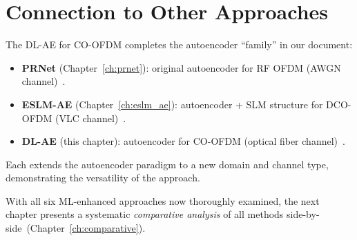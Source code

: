 \section{Connection to Other Approaches}
\label{sec:dlae_connections}

The DL-AE for CO-OFDM completes the autoencoder ``family'' in our document:
\begin{itemize}
    \item \textbf{PRNet} (Chapter~\ref{ch:prnet}): original autoencoder for
          RF OFDM (AWGN channel)~\cite{kim2017novel}.
    \item \textbf{ESLM-AE} (Chapter~\ref{ch:eslm_ae}): autoencoder +
          SLM structure for DCO-OFDM (VLC channel)~\cite{hao2019extended}.
    \item \textbf{DL-AE} (this chapter): autoencoder for CO-OFDM
          (optical fiber channel)~\cite{alnaseri2025deep}.
\end{itemize}

Each extends the autoencoder paradigm to a new domain and channel type,
demonstrating the versatility of the approach.

With all six ML-enhanced approaches now thoroughly examined, the next
chapter presents a systematic \emph{comparative analysis} of all methods
side-by-side~(Chapter~\ref{ch:comparative}).
